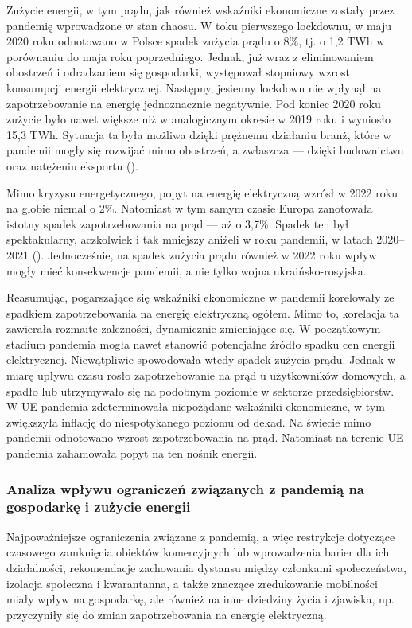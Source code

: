 \documentclass[polish, twoside, 12pt, a4paper]{article}
\theoremstyle{definition}
\theoremstyle{plain}
\theoremstyle{remark}
\begin{document}
Zużycie energii, w tym prądu, jak również wskaźniki ekonomiczne zostały przez pandemię wprowadzone w stan chaosu. W toku pierwszego lockdownu, w maju 2020 roku odnotowano w Polsce spadek zużycia prądu o 8\%, tj. o 1,2 TWh w porównaniu do maja roku poprzedniego. Jednak, już wraz z eliminowaniem obostrzeń i odradzaniem się gospodarki, występował stopniowy wzrost konsumpcji energii elektrycznej. Następny, jesienny lockdown nie wpłynął na zapotrzebowanie na energię jednoznacznie negatywnie. Pod koniec 2020 roku zużycie było nawet większe niż w analogicznym okresie w 2019 roku i wyniosło 15,3 TWh. Sytuacja ta była możliwa dzięki prężnemu działaniu branż, które w pandemii mogły się rozwijać mimo obostrzeń, a zwłaszcza --- dzięki budownictwu oraz natężeniu eksportu (\cite{tygodnikprzeglad2021}). 

Mimo kryzysu energetycznego, popyt na energię elektryczną wzrósł w 2022 roku na globie niemal o 2\%. Natomiast w tym samym czasie Europa zanotowała istotny spadek zapotrzebowania na prąd --- aż o 3,7\%. Spadek ten był spektakularny, aczkolwiek i tak mniejszy aniżeli w roku pandemii, w latach 2020--2021 (\cite{maciuch2023}). Jednocześnie, na spadek zużycia prądu również w 2022 roku wpływ mogły mieć konsekwencje pandemii, a nie tylko wojna ukraińsko-rosyjska. 

Reasumując, pogarszające się wskaźniki ekonomiczne w pandemii korelowały ze spadkiem zapotrzebowania na energię elektryczną ogółem. Mimo to, korelacja ta zawierała rozmaite zależności, dynamicznie zmieniające się. W początkowym stadium pandemia mogła nawet stanowić potencjalne źródło spadku cen energii elektrycznej. Niewątpliwie spowodowała wtedy spadek zużycia prądu. Jednak w miarę upływu czasu rosło zapotrzebowanie na prąd u użytkowników domowych, a spadło lub utrzymywało się na podobnym poziomie w sektorze przedsiębiorstw. W UE pandemia zdeterminowała niepożądane wskaźniki ekonomiczne, w tym zwiększyła inflację do niespotykanego poziomu od dekad. Na świecie mimo pandemii odnotowano wzrost zapotrzebowania na prąd. Natomiast na terenie UE pandemia zahamowała popyt na ten nośnik energii.


\subsubsection{Analiza wpływu ograniczeń związanych z pandemią na gospodarkę i zużycie energii}

Najpoważniejsze ograniczenia związane z pandemią, a więc restrykcje dotyczące czasowego zamknięcia obiektów komercyjnych lub wprowadzenia barier dla ich działalności, rekomendacje zachowania dystansu między członkami społeczeństwa, izolacja społeczna i kwarantanna, a także znaczące zredukowanie mobilności miały wpływ na gospodarkę, ale również na inne dziedziny życia i zjawiska, np. przyczyniły się do zmian zapotrzebowania na energię elektryczną.
\end{document}
